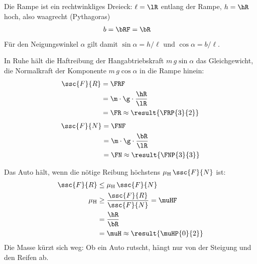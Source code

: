Die Rampe ist ein rechtwinkliges Dreieck: $\ell = \lR$ entlang der Rampe, $h = \hR$ hoch, also waagrecht (Pythagoras)
\begin{align}
 b &= \bRF = \bR
\end{align}
Für den Neigungswinkel $\alpha$ gilt damit $\sin\alpha = h/\ell$ und $\cos\alpha = b/\ell$.

\begin{center}
\end{center}

\begin{abcliste}
\abc
In Ruhe hält die Haftreibung der Hangabtriebskraft $m\,g\sin\alpha$ das Gleichgewicht, die Normalkraft der Komponente $m\,g\cos\alpha$ in die Rampe hinein:
\begin{align}
 \ssc{F}{R} &= \FRF \\
   &= \m\cdot\g\cdot\frac{\hR}{\lR} \\
   &= \FR \approx \result{\FRP{3}{2}}
\end{align}
\begin{align}
 \ssc{F}{N} &= \FNF \\
   &= \m\cdot\g\cdot\frac{\bR}{\lR} \\
   &= \FN \approx \result{\FNP{3}{3}}
\end{align}

\abc
Das Auto hält, wenn die nötige Reibung höchstens $\mu_\mathrm{H}\,\ssc{F}{N}$ ist:
\begin{align}
 \ssc{F}{R} &\le \mu_\mathrm{H}\,\ssc{F}{N} \\
 \mu_\mathrm{H} &\ge \frac{\ssc{F}{R}}{\ssc{F}{N}} = \muHF \\
   &= \frac{\hR}{\bR} \\
   &= \muH \approx \result{\muHP{0}{2}}
\end{align}
Die Masse kürzt sich weg: Ob ein Auto rutscht, hängt nur von der Steigung und den Reifen ab.
\end{abcliste}

